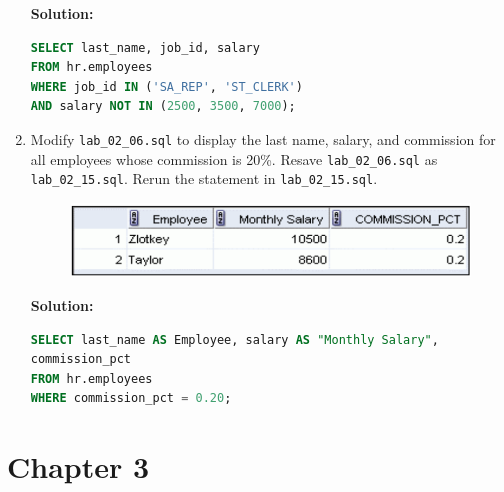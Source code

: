 \documentclass[a4paper,12pt]{article}
\begin{document}
\begin{enumerate}
\textbf{Solution: }
    \begin{lstlisting}[language=SQL, label={lst:employees_data}]
SELECT last_name, job_id, salary
FROM hr.employees
WHERE job_id IN ('SA_REP', 'ST_CLERK')
AND salary NOT IN (2500, 3500, 7000);
    \end{lstlisting}
    \item Modify \texttt{lab\_02\_06.sql} to display the last name, salary, and commission for all employees
whose commission is 20\%. Resave \texttt{lab\_02\_06.sql} as \texttt{lab\_02\_15.sql}. Rerun the
statement in \texttt{lab\_02\_15.sql}.
\begin{figure}[h]
    \centering
    \includegraphics*[width=.7\linewidth]{graphics/215.png}
\end{figure}

\textbf{Solution: }
    \begin{lstlisting}[language=SQL, label={lst:employees_data}]
SELECT last_name AS Employee, salary AS "Monthly Salary",
commission_pct
FROM hr.employees
WHERE commission_pct = 0.20;
    \end{lstlisting}
\end{enumerate}
\newpage
\section*{Chapter 3}
\end{document}
